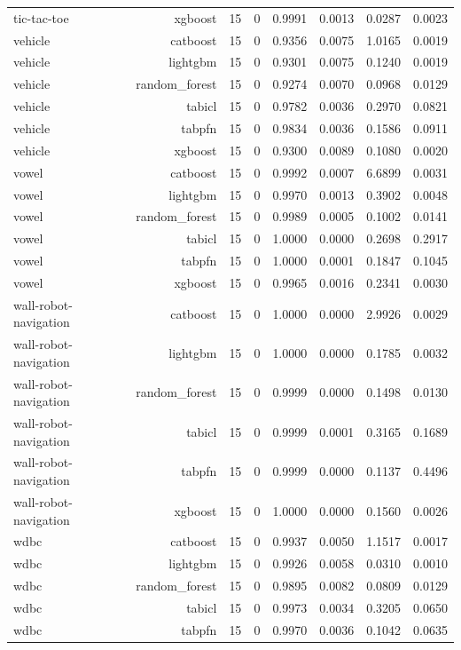 \begin{table}[htbp]
\begin{tabular}{lrrrrrrr}
tic-tac-toe & xgboost & 15 & 0 & 0.9991 & 0.0013 & 0.0287 & 0.0023 \\
vehicle & catboost & 15 & 0 & 0.9356 & 0.0075 & 1.0165 & 0.0019 \\
vehicle & lightgbm & 15 & 0 & 0.9301 & 0.0075 & 0.1240 & 0.0019 \\
vehicle & random\_forest & 15 & 0 & 0.9274 & 0.0070 & 0.0968 & 0.0129 \\
vehicle & tabicl & 15 & 0 & 0.9782 & 0.0036 & 0.2970 & 0.0821 \\
vehicle & tabpfn & 15 & 0 & 0.9834 & 0.0036 & 0.1586 & 0.0911 \\
vehicle & xgboost & 15 & 0 & 0.9300 & 0.0089 & 0.1080 & 0.0020 \\
vowel & catboost & 15 & 0 & 0.9992 & 0.0007 & 6.6899 & 0.0031 \\
vowel & lightgbm & 15 & 0 & 0.9970 & 0.0013 & 0.3902 & 0.0048 \\
vowel & random\_forest & 15 & 0 & 0.9989 & 0.0005 & 0.1002 & 0.0141 \\
vowel & tabicl & 15 & 0 & 1.0000 & 0.0000 & 0.2698 & 0.2917 \\
vowel & tabpfn & 15 & 0 & 1.0000 & 0.0001 & 0.1847 & 0.1045 \\
vowel & xgboost & 15 & 0 & 0.9965 & 0.0016 & 0.2341 & 0.0030 \\
wall-robot-navigation & catboost & 15 & 0 & 1.0000 & 0.0000 & 2.9926 & 0.0029 \\
wall-robot-navigation & lightgbm & 15 & 0 & 1.0000 & 0.0000 & 0.1785 & 0.0032 \\
wall-robot-navigation & random\_forest & 15 & 0 & 0.9999 & 0.0000 & 0.1498 & 0.0130 \\
wall-robot-navigation & tabicl & 15 & 0 & 0.9999 & 0.0001 & 0.3165 & 0.1689 \\
wall-robot-navigation & tabpfn & 15 & 0 & 0.9999 & 0.0000 & 0.1137 & 0.4496 \\
wall-robot-navigation & xgboost & 15 & 0 & 1.0000 & 0.0000 & 0.1560 & 0.0026 \\
wdbc & catboost & 15 & 0 & 0.9937 & 0.0050 & 1.1517 & 0.0017 \\
wdbc & lightgbm & 15 & 0 & 0.9926 & 0.0058 & 0.0310 & 0.0010 \\
wdbc & random\_forest & 15 & 0 & 0.9895 & 0.0082 & 0.0809 & 0.0129 \\
wdbc & tabicl & 15 & 0 & 0.9973 & 0.0034 & 0.3205 & 0.0650 \\
wdbc & tabpfn & 15 & 0 & 0.9970 & 0.0036 & 0.1042 & 0.0635 \\

\end{tabular}
\end{table}

